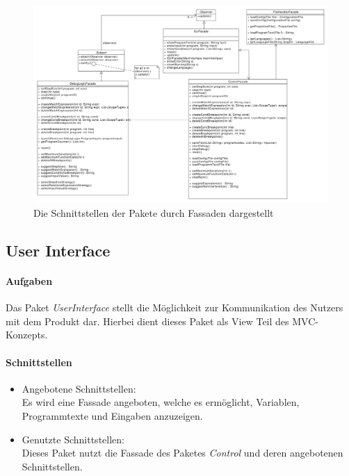\documentclass[parskip=full]{scrartcl}
\begin{document}
\newpage

\begin{landscape}

\begin{figure}[!h]
\centering
\includegraphics[scale=0.4]{diagrammIdeenUmlet/fassaden.pdf}
\caption{Die Schnittstellen der Pakete durch Fassaden dargestellt}
\label{fig:fassaden}
\end{figure}
\end{landscape}

\newpage

\subsection{User Interface}
\paragraph{Aufgaben} Das Paket \textit{UserInterface} stellt die Möglichkeit zur Kommunikation des Nutzers mit dem Produkt dar. Hierbei dient dieses Paket als View Teil des MVC-Konzepts.
\paragraph{Schnittstellen} 
\begin{itemize}
\item Angebotene Schnittstellen:\\
Es wird eine Fassade angeboten, welche es ermöglicht, Variablen, Programmtexte und Eingaben anzuzeigen.
\item Genutzte Schnittstellen:\\
Dieses Paket nutzt die Fassade des Paketes \textit{Control} und deren angebotenen Schnittstellen.
\end{itemize}
\end{document}
